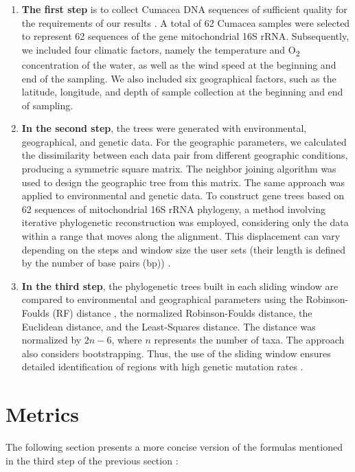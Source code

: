 \begin{enumerate}
\item \textbf{The first step} is to collect Cumacea DNA sequences of sufficient quality for the requirements of our results \citep{koshkarov_phylogeography_2022}. A total of 62 Cumacea samples were selected to represent 62 sequences of the gene mitochondrial 16S rRNA. Subsequently, we included four climatic factors, namely the temperature and O\textsubscript{2} concentration of the water, as well as the wind speed at the beginning and end of the sampling. We also included six geographical factors, such as the latitude, longitude, and depth of sample collection at the beginning and end of sampling.

\item \textbf{In the second step}, the trees were generated with environmental, geographical, and genetic data. For the geographic parameters, we calculated the dissimilarity between each data pair from different geographic conditions, producing a symmetric square matrix. The neighbor joining algorithm was used to design the geographic tree from this matrix. The same approach was applied to environmental and genetic data. To construct gene trees based on 62 sequences of mitochondrial 16S rRNA phylogeny, a method involving iterative phylogenetic reconstruction was employed, considering only the data within a range that moves along the alignment. This displacement can vary depending on the steps and window size the user sets (their length is defined by the number of base pairs (bp)) \citep{koshkarov_phylogeography_2022}.

\item \textbf{In the third step}, the phylogenetic trees built in each sliding window are compared to environmental and geographical parameters using the Robinson-Foulds (RF) distance \citep{robinson_comparison_1981, koshkarov_phylogeography_2022}, the normalized Robinson-Foulds distance, the Euclidean distance, and the Least-Squares distance. The distance was normalized by $2n-6$, where $n$ represents the number of taxa. The approach also considers bootstrapping. Thus, the use of the sliding window ensures detailed identification of regions with high genetic mutation rates \citep{koshkarov_phylogeography_2022}.
\end{enumerate}


\section{Metrics}\label{metrics}
The following section presents a more concise version of the formulas mentioned in the third step of the previous section :

